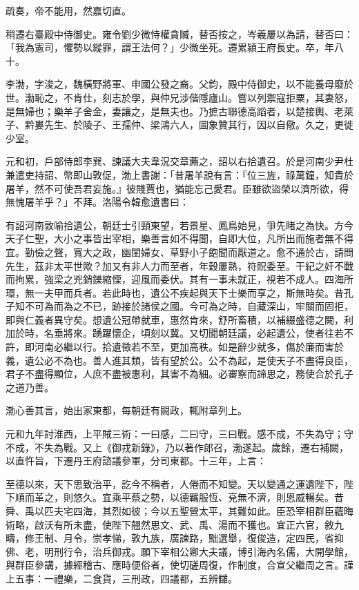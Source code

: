 \begin{pinyinscope}
 疏奏，帝不能用，然嘉切直。



 稍遷右臺殿中侍御史。雍令劉少微恃權貪贓，替否按之，岑羲屢以為請，替否曰：「我為憲司，懼勢以縱罪，謂王法何？」少微坐死。遷累潁王府長史。卒，年八十。



 李渤，字浚之，魏橫野將軍、申國公發之裔。父鈞，殿中侍御史，以不能養母廢於世。渤恥之，不肯仕，刻志於學，與仲兄涉偕隱廬山。嘗以列禦寇拒粟，其妻怒，是無婦也；樂羊子舍金，妻讓之，是無夫也。乃摭古聯德高蹈者，以楚接輿、老萊子、黔婁先生、於陵子、王孺仲、梁鴻六人，圖象贊其行，因以自儆。久之，更徙少室。



 元和初，戶部侍郎李巽、諫議大夫韋況交章薦之，詔以右拾遺召。於是河南少尹杜兼遣吏持詔、幣即山敦促，渤上書謝：「昔屠羊說有言：『位三旌，祿萬鐘，知貴於屠羊，然不可使吾君妄施。』彼賤賈也，猶能忘己愛君。臣雖欲盜榮以濟所欲，得無愧屠羊乎？」不拜。洛陽令韓愈遺書曰：



 有詔河南敦喻拾遺公，朝廷士引頸東望，若景星、鳳鳥始見，爭先睹之為快。方今天子仁聖，大小之事皆出宰相，樂善言如不得聞，自即大位，凡所出而施者無不得宜。勤儉之聲，寬大之政，幽閨婦女、草野小子飽聞而厭道之。愈不通於古，請問先生，茲非太平世歟？加又有非人力而至者，年穀屢熟，符貺委至。干紀之奸不戰而拘累，強梁之兇銷鑠縮慄，迎風而委伏。其有一事未就正，視若不成人。四海所環，無一夫甲而兵者。若此時也，遺公不疾起與天下士樂而享之，斯無時矣。昔孔子知不可為而為之不已，跡接於諸侯之國。今可為之時，自藏深山，牢關而固拒，即與仁義者異守矣。想遺公冠帶就車，惠然肯來，舒所畜積，以補綴盛德之闕，利加於時，名垂將來。踴躍懷企，頃刻以冀。又切聞朝廷議，必起遺公，使者往若不許，即河南必繼以行。拾遺徵若不至，更加高秩。如是辭少就多，傷於廉而害於義，遺公必不為也。善人進其類，皆有望於公。公不為起，是使天子不盡得良臣，君子不盡得顯位，人庶不盡被惠利，其害不為細。必審察而諦思之，務使合於孔子之道乃善。



 渤心善其言，始出家東都，每朝廷有闕政，輒附章列上。



 元和九年討淮西，上平賊三術：一曰感，二曰守，三曰戰。感不成，不失為守；守不成，不失為戰。又上《御戎新錄》，乃以著作郎召，渤遂起。歲餘，遷右補闕，以直忤旨，下遷丹王府諮議參軍，分司東都。十三年，上言：



 至德以來，天下思致治平，訖今不稱者，人倦而不知變。天以變通之運遺陛下，陛下順而革之，則悠久。宜乘平蔡之勢，以德羈服恆、兗無不濟，則恩威暢矣。昔舜、禹以匹夫宅四海，其烈如彼；今以五聖營太平，其難如此。臣恐宰相群臣蘊晦術略，啟沃有所未盡，使陛下翹然思文、武、禹、湯而不獲也。宜正六官，敘九疇，修王制、月令，崇孝悌，敦九族，廣諫路，黜選舉，復俊造，定四民，省抑佛、老，明刑行令，治兵御戎。願下宰相公卿大夫議，博引海內名儒，大開學館，與群臣參講，據經稽古、應時便俗者，使切磋周復，作制度，合宣父繼周之言。謹上五事：一禮樂，二食貨，三刑政，四議都，五辨讎。




\end{pinyinscope}
